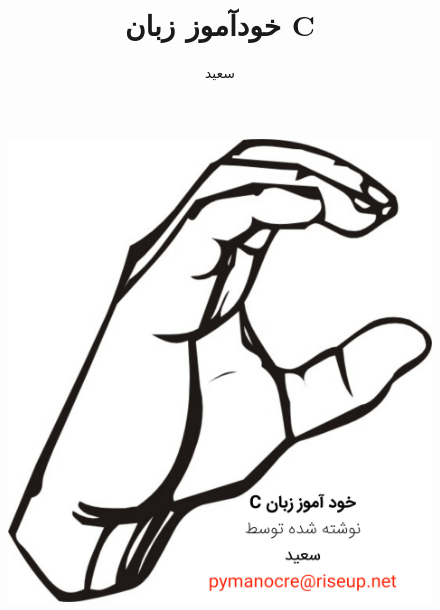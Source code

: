 \documentclass[12pt,oneside]{book}
\title{\textbf{خودآموز زبان C}}
\author{سعید}
\begin{document}
\paragraphfootnotes
\begin{figure}
\centering
\includegraphics[width=150mm]{c_artwork}
\end{figure}
\clearpage\maketitle
\thispagestyle{empty}
\tableofcontents
{}


\end{document}
